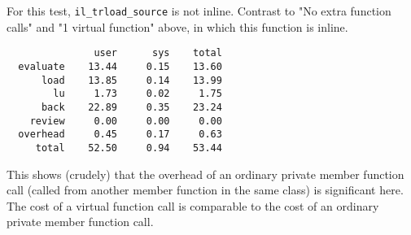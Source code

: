 For this test, {\tt il\_trload\_source} is not inline.  Contrast
to "No extra function calls" and "1 virtual function" above, in
which this function is inline.
\begin{verbatim}
               user      sys    total
  evaluate    13.44     0.15    13.60
      load    13.85     0.14    13.99
        lu     1.73     0.02     1.75
      back    22.89     0.35    23.24
    review     0.00     0.00     0.00
  overhead     0.45     0.17     0.63
     total    52.50     0.94    53.44
\end{verbatim}

This shows (crudely) that the overhead of an ordinary private member
function call (called from another member function in the same
class) is significant here.  The cost of a virtual function call
is comparable to the cost of an ordinary private member function
call.
